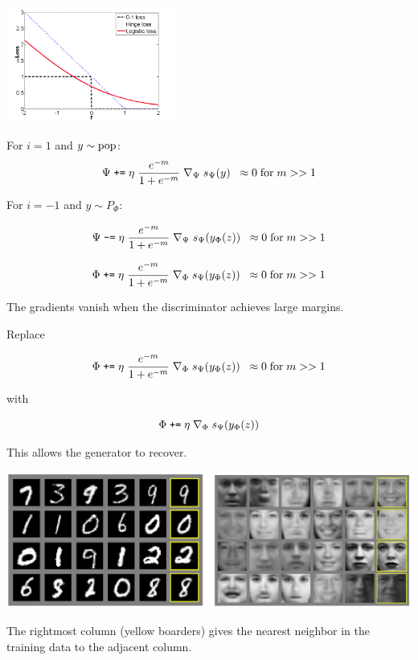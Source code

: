 {\centerline{\includegraphics[height= 1.5in]{../images/logloss}}


For $i = 1$ and $y \sim \mathrm{pop}$:
$$\Psi \;\mbox{\tt +=} \; \eta\;\frac{e^{-m}}{1 + e^{-m}}\;\nabla_\Psi \; s_\Psi(y) \;\;\approx 0 \;\mbox{for}\;m >> 1$$

\vfill
For $i = -1$ and $y \sim P_\Phi$:

$$\Psi \;\mbox{\tt -=} \; \eta\;\frac{e^{-m}}{1 + e^{-m}}\;\nabla_\Psi\;s_\Psi(y_\Phi(z)) \;\;\approx 0 \;\mbox{for}\;m >> 1$$

\vfill
$$\Phi \;\mbox{\tt +=} \; \eta\;\frac{e^{-m}}{1 + e^{-m}}\;\nabla_\Phi\; s_\Psi(y_\Phi(z)) \;\;\approx 0 \;\mbox{for}\;m >> 1$$

\vfill
The gradients vanish when the discriminator achieves large margins.


Replace

$$\Phi \;\mbox{\tt +=} \; \eta\;\frac{e^{-m}}{1 + e^{-m}}\;\nabla_\Phi\; s_\Psi(y_\Phi(z)) \;\;\approx 0 \;\mbox{for}\;m >> 1$$

\vfill
with

$$\Phi \;\mbox{\tt +=} \; \eta\;\nabla_\Phi \; s_\Psi(y_\Phi(z))$$

\vfill
This allows the generator to recover.

\centerline{\includegraphics[width = 9in]{../images/GAN2014}}
The rightmost column (yellow boarders) gives the nearest neighbor in the training data to the adjacent column.


}
